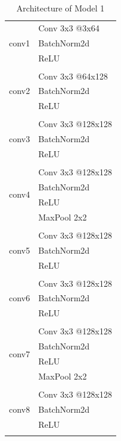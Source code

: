 \documentclass{article}
\begin{document}
\begin{table}[htbp]
\begin{minipage}[t]{0.48\textwidth}
  \centering
  \caption{Architecture of Model 1}
    \begin{tabular}{c|l}
    \multirow{3}[0]{*}{conv1} & Conv 3x3 @3x64 \\
          & BatchNorm2d \\
          & ReLU  \\
\hline \\ [-1.5ex]
    \multirow{3}[0]{*}{conv2} & Conv 3x3 @64x128 \\
          & BatchNorm2d \\
          & ReLU  \\
\hline \\ [-1.5ex]
    \multirow{3}[0]{*}{conv3} & Conv 3x3 @128x128 \\
          & BatchNorm2d \\
          & ReLU  \\
\hline \\ [-1.5ex]
    \multirow{4}[0]{*}{conv4} & Conv 3x3 @128x128 \\
          & BatchNorm2d \\
          & ReLU  \\
          & MaxPool 2x2 \\\hline \\ [-1.5ex]
    \multirow{3}[0]{*}{conv5} & Conv 3x3 @128x128 \\
          & BatchNorm2d \\
          & ReLU  \\\hline \\ [-1.5ex]
    \multirow{3}[0]{*}{conv6} & Conv 3x3 @128x128 \\
          & BatchNorm2d \\
          & ReLU  \\\hline \\ [-1.5ex]
    \multirow{4}[0]{*}{conv7} & Conv 3x3 @128x128 \\
          & BatchNorm2d \\
          & ReLU  \\
          & MaxPool 2x2 \\\hline \\ [-1.5ex]
    \multirow{3}[0]{*}{conv8} & Conv 3x3 @128x128 \\
          & BatchNorm2d \\
          & ReLU  \\\hline \\ [-1.5ex]

\end{tabular}
\end{minipage}
\end{table}
\end{document}
